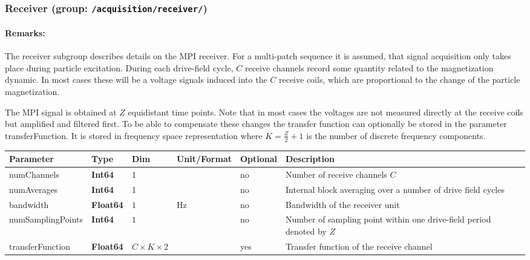 \documentclass[landscape,a4paper]{article} %
\newcommand{\inl}[1]{\lstinline[columns=fixed]{#1}}
\newcommand{\inltab}[1]{{\ttfamily\bfseries\color{blue}#1}}
\newcommand{\inlvar}[1]{{\ttfamily#1}}
\begin{document}
\subsubsection{Receiver (group: \inl{/acquisition/receiver/})}

\begin{multicols}{2}
\paragraph{Remarks:} The receiver subgroup describes details on the MPI receiver. For a multi-patch sequence it is assumed, that signal acquisition only takes place during particle excitation. During each drive-field cycle, $C$ receive channels record some quantity related to the magnetization dynamic. In most cases these will be a voltage signals induced into the $C$ receive coils, which are proportional to the change of the particle magnetization. 

The MPI signal is obtained at $Z$ equidistant time points. Note that in most cases the voltages are not measured directly at the receive coils but amplified and filtered first. To be able to compensate these changes the transfer function can optionally be stored in the parameter \inlvar{transferFunction}. It is stored in frequency space representation where $K=\frac{Z}{2}+1$ is the number of discrete frequency components.
\end{multicols}

\noindent \begin{tabularx}{\columnwidth}{lllllX} 
\textbf{Parameter} & \textbf{Type} & \textbf{Dim} & \textbf{Unit/Format} & \textbf{Optional} & \textbf{Description} \\ \hline 
\inlvar{numChannels} & \inltab{Int64} & 1 & & no & Number of receive channels $C$ \\ \hline 
\inlvar{numAverages} & \inltab{Int64} & 1 & & no & Internal block averaging over a number of drive field cycles \\ \hline 
\inlvar{bandwidth} & \inltab{Float64} & $1$ & Hz & no & Bandwidth of the receiver unit \\ \hline
\inlvar{numSamplingPoints} & \inltab{Int64} & $1$ &  & no & Number of sampling point within one drive-field period denoted by $Z$ \\ \hline
\inlvar{transferFunction} & \inltab{Float64} & $C \times K \times 2$ &  & yes & Transfer function of the receive channel \\ \hline
\end{tabularx}
\end{document}
